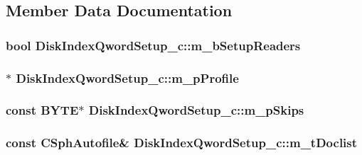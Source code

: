 \subsection{Member Data Documentation}
\hypertarget{classDiskIndexQwordSetup__c_a349f17559685f9d8ec57254a0b37a9b5}{
\subsubsection[{m\-\_\-b\-Setup\-Readers}]{\setlength{\rightskip}{0pt plus 5cm}bool Disk\-Index\-Qword\-Setup\-\_\-c\-::m\-\_\-b\-Setup\-Readers}}\label{classDiskIndexQwordSetup__c_a349f17559685f9d8ec57254a0b37a9b5}
\hypertarget{classDiskIndexQwordSetup__c_a40564498df781f6ecc7d66969818b626}{
\subsubsection[{m\-\_\-p\-Profile}]{$\ast$ Disk\-Index\-Qword\-Setup\-\_\-c\-::m\-\_\-p\-Profile}}\label{classDiskIndexQwordSetup__c_a40564498df781f6ecc7d66969818b626}
\hypertarget{classDiskIndexQwordSetup__c_af0ea34a19ba2b419e43479bd31526ec6}{
\subsubsection[{m\-\_\-p\-Skips}]{\setlength{\rightskip}{0pt plus 5cm}const {\bf B\-Y\-T\-E}$\ast$ Disk\-Index\-Qword\-Setup\-\_\-c\-::m\-\_\-p\-Skips}}\label{classDiskIndexQwordSetup__c_af0ea34a19ba2b419e43479bd31526ec6}
\hypertarget{classDiskIndexQwordSetup__c_a068209d1b3bac03b386cd46290748ab2}{
\subsubsection[{m\-\_\-t\-Doclist}]{\setlength{\rightskip}{0pt plus 5cm}const {\bf C\-Sph\-Autofile}\& Disk\-Index\-Qword\-Setup\-\_\-c\-::m\-\_\-t\-Doclist}}\label{classDiskIndexQwordSetup__c_a068209d1b3bac03b386cd46290748ab2}
